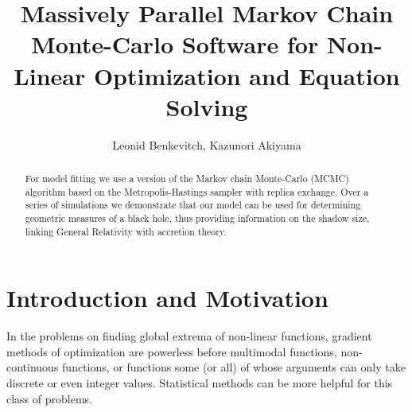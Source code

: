 \documentclass[preprint2]{aastex}
\begin{document}
\title{Massively Parallel Markov Chain Monte-Carlo Software for Non-Linear Optimization and Equation Solving}

\author{Leonid Benkevitch, Kazunori Akiyama}

\begin{abstract} \small 
For model fitting we use a version of the Markov chain Monte-Carlo (MCMC) algorithm based on the Metropolis-Hastings sampler with replica exchange. Over a series of simulations we demonstrate that our model can be used for determining geometric measures of a black hole, thus providing information on the shadow size, linking General Relativity with accretion theory. \\
\end{abstract}

\tableofcontents
\newpage


\section{Introduction and Motivation}

In the problems on finding global extrema of non-linear functions, gradient methods of optimization are powerless before multimodal functions, non-continuous functions, or functions some (or all) of whose arguments can only take discrete or even integer values. Statistical methods can be more helpful for this class of problems. 
\end{document}

